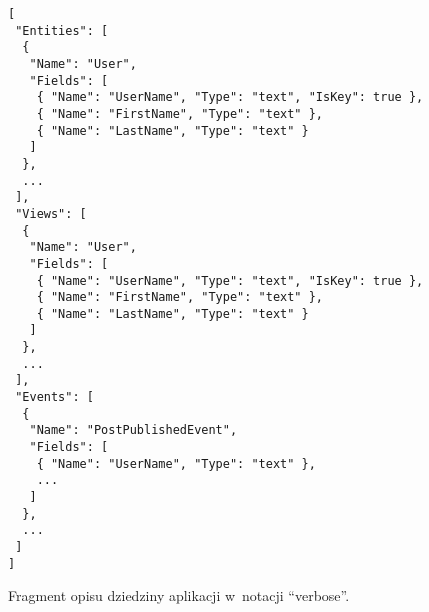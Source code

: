 \begin{figure}[!ht]
\begin{verbatim}
[
 "Entities": [
  {
   "Name": "User",
   "Fields": [
    { "Name": "UserName", "Type": "text", "IsKey": true },
    { "Name": "FirstName", "Type": "text" },
    { "Name": "LastName", "Type": "text" }
   ]
  },
  ...
 ],
 "Views": [
  {
   "Name": "User",
   "Fields": [
    { "Name": "UserName", "Type": "text", "IsKey": true },
    { "Name": "FirstName", "Type": "text" },
    { "Name": "LastName", "Type": "text" }
   ]
  },
  ...
 ],
 "Events": [
  {
   "Name": "PostPublishedEvent",
   "Fields": [
    { "Name": "UserName", "Type": "text" },
    ...
   ]
  },
  ...
 ]
]
\end{verbatim}
\caption{Fragment opisu dziedziny aplikacji w~notacji ``verbose''.}
\label{fig:single:model_verbose}
\end{figure}
